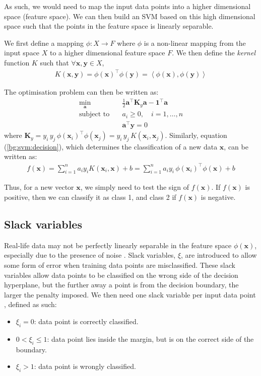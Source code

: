 \documentclass[12pt, twoside, a4paper]{report}
\def\vec{\boldsymbol}
\begin{document}
As such, we would need to map the input data points into a higher dimensional space (feature space). We can then build an SVM based on this high dimensional space such that the points in the feature space is linearly separable.

We first define a mapping $\phi : X \rightarrow F$ where $\phi$ is a non-linear mapping from the input space $X$ to a higher dimensional feature space $F$. We then define the \textit{kernel} function $K$ such that $\forall \vec x, \vec y \in X$,
\begin{align*}
K(\vec x, \vec y) = \phi(\vec x)^\top \phi(\vec{y}) = \left\langle \phi(\vec x) , \phi(\vec{y}) \right\rangle
\end{align*}

The optimisation problem can then be written as:
\begin{align*}
\min_{\vec a} \quad &\frac{1}{2} \vec{a}^\top \vec{K}_y \vec{a} - \vec{1}^\top \vec a \\
\text{subject to} \quad &a_i \geq 0, \quad i = 1, \dots , n \\
&\vec{a}^\top \vec y = 0
\end{align*}
where $\vec{K}_y = y_i \, y_j \, \phi(\vec{x}_i)^\top \phi(\vec{x}_j) = y_i \, y_j \, K(\vec{x}_i, \vec{x}_j)$. Similarly, equation (\ref{bg:svm:decision}), which determines the classification of a new data $\vec{x}$, can be written as:
\begin{align*}
f(\vec{x}) = \sum_{i=1}^n a_i y_i K(\vec{x}_i, \vec{x}) + b = \sum_{i=1}^n a_i y_i \, \phi(\vec{x}_i)^\top \phi(\vec{x}) + b
\end{align*}

Thus, for a new vector $\vec{x}$, we simply need to test the sign of $f(\vec{x})$. If $f(\vec{x})$ is positive, then we can classify it as class 1, and class 2 if $f(\vec{x})$ is negative.

\subsection{Slack variables}
Real-life data may not be perfectly linearly separable in the feature space $\phi(\vec{x})$, especially due to the presence of noise \cite{RefWorks:127}. Slack variables, $\xi$, are introduced to allow some form of error when training data points are misclassified. These slack variables allow data points to be classified on the wrong side of the decision hyperplane, but the further away a point is from the decision boundary, the larger the penalty imposed. We then need one slack variable per input data point \cite{RefWorks:126}, defined as such:
\begin{itemize}
\item $\xi_i = 0$: data point is correctly classified.
\item $0 < \xi_i \leq 1$: data point lies inside the margin, but is on the correct side of the boundary.
\item $\xi_i > 1$: data point is wrongly classified.
\end{itemize}
\end{document}
